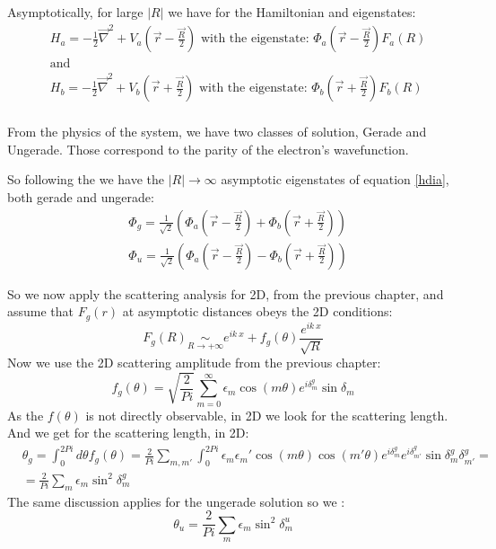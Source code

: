 Asymptotically, for large $ |R| $ we have for the Hamiltonian and eigenstates:
\begin{equation}
\begin{split} 
  & H_a = -\frac{1}{2}\vec{\nabla}^2 + V_a(\vec{r} - \frac{\vec{R}}{2}) \text{ with the eigenstate: } \Phi_a(\vec{r} - \frac{\vec{R}}{2}) F_a(R) \\
  & \text{and} \\
  & H_b = -\frac{1}{2}\vec{\nabla}^2 + V_b(\vec{r} + \frac{\vec{R}}{2}) \text{ with the eigenstate: } \Phi_b(\vec{r} + \frac{\vec{R}}{2}) F_b(R) \\
\end{split} 
\end{equation}

From the physics of the system, we have two classes of solution, Gerade and Ungerade. Those correspond to the parity of the electron's wavefunction.

So following the \cite{Dalgarno1953} we have the $ |R| \rightarrow \infty $ asymptotic eigenstates of equation \eqref{hdia}, both gerade and ungerade:
\begin{equation}
\begin{split}
  & \Phi_g = \frac{1}{\sqrt{2}}\left(\Phi_a(\vec{r} - \frac{\vec{R}}{2}) + \Phi_b(\vec{r} + \frac{\vec{R}}{2})\right) \\
  & \Phi_u = \frac{1}{\sqrt{2}}\left(\Phi_a(\vec{r} - \frac{\vec{R}}{2}) - \Phi_b(\vec{r} + \frac{\vec{R}}{2})\right) 
\end{split}
\end{equation}

So we now apply the scattering analysis for 2D, from the previous chapter, and assume that $ F_g(r) $ at asymptotic distances obeys the 2D conditions:
\begin{equation}
  F_g(R) \underset{R \rightarrow +\infty}{\sim} e^{ik\ x} + f_g(\theta)\frac{e^{ik\ x}}{\sqrt{R}} 
\end{equation}
Now we use the 2D scattering amplitude from the previous chapter:
\begin{equation}\label{fgampl}
  f_g(\theta) = \sqrt{\frac{2}{Pi}}\sum_{m=0}^{\infty}{\epsilon_m \cos(m\theta)e^{i\delta_m^g}\sin\delta_m}
\end{equation}
As the $ f(\theta) $ is not directly observable, in 2D we look for the scattering length. And we get for the scattering length, in 2D:
\begin{equation}
\begin{split}
  & \theta_g = \int_{0}^{2Pi}{d\theta f_g(\theta)} = \frac{2}{Pi}\sum_{m,m'}\int_{0}^{2Pi}{\epsilon_m\epsilon_m' \cos(m\theta)\cos(m'\theta)e^{i\delta_{m}^g}e^{i\delta_{m'}^g}\sin\delta_m^g\delta_{m'}^g} = \\
  & = \frac{2}{Pi}\sum_{m}{\epsilon_m\sin^2\delta_m^g}
\end{split}
\end{equation}
The same discussion applies for the ungerade solution so we :
\begin{equation}
  \theta_u = \frac{2}{Pi}\sum_{m}{\epsilon_m\sin^2\delta_m^u}
\end{equation}

